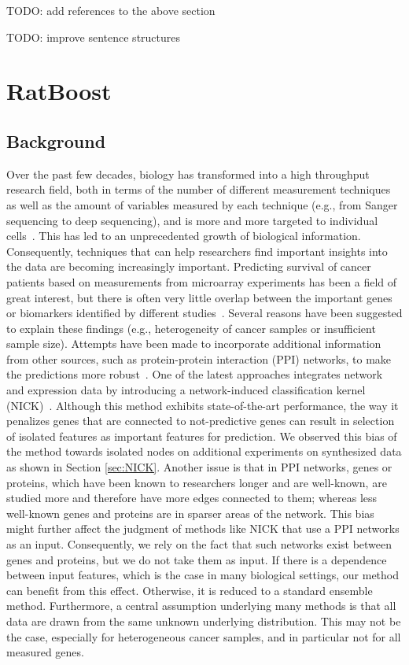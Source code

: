 TODO: add references to the above section

TODO: improve sentence structures

\section{RatBoost}
\label{chap:ratboost-chapter}
\subsection{Background}
Over the past few decades, biology has transformed into a high throughput research field, both in terms of the number of different measurement techniques as well as the amount of variables measured by each technique (e.g., from Sanger sequencing to deep sequencing), and is more and more targeted to individual cells~\cite{Shapiro2013}. This has led to an unprecedented growth of biological information. Consequently, techniques that can help researchers find important insights into the data are becoming increasingly important.
Predicting survival of cancer patients based on measurements from
microarray experiments has been a field of great interest, but there
is often very little overlap between the important genes or biomarkers
identified by different studies~\cite{Ein-Dor2005}. Several reasons
have been suggested to explain these findings (e.g., heterogeneity of
cancer samples or insufficient sample size). Attempts have been made
to incorporate additional information from other sources, such as
protein-protein interaction (PPI) networks, to make the predictions
more robust~\cite{Chuang2007}. One of the latest approaches integrates
network and expression data by introducing a network-induced
classification kernel (NICK)~\cite{Lavi2012}. Although this method
exhibits state-of-the-art performance, the way it penalizes genes that
are connected to not-predictive genes can result in selection of
isolated features as important features for prediction. We observed
this bias of the method towards isolated nodes on additional
experiments on synthesized data as shown in Section \ref{sec:NICK}. Another issue is that in PPI networks, genes or proteins, which
have been known to researchers longer and are well-known, are studied
more and therefore have more edges connected to them; whereas less
well-known genes and proteins are in sparser areas of the
network. This bias might further affect the judgment of methods like
NICK that use a PPI networks as an input. Consequently, we rely on the
fact that such networks exist between genes and proteins, but we do
not take them as input. If
there is a dependence between input features, which is the case in
many biological settings, our method can benefit from this
effect. Otherwise, it is reduced to a standard ensemble method.
Furthermore, a central assumption underlying many methods is that all data are drawn from the same unknown underlying distribution. This may not be the case, especially for heterogeneous cancer samples, and in particular not for all measured genes.

